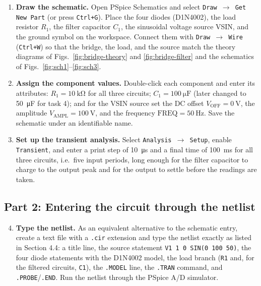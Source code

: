 \documentclass[12pt,a4paper]{article}
\begin{document}
	\begin{enumerate}[leftmargin=0.8cm,label=\textbf{Step \arabic*:},itemsep=0.55em]
		\item \textbf{Draw the schematic.}
		Open PSpice Schematics and select \texttt{Draw $\rightarrow$ Get New Part} (or press \texttt{Ctrl+G}). Place the four diodes (D1N4002), the load resistor $R_1$, the filter capacitor $C_1$, the sinusoidal voltage source VSIN, and the ground symbol on the workspace. Connect them with \texttt{Draw $\rightarrow$ Wire} (\texttt{Ctrl+W}) so that the bridge, the load, and the source match the theory diagrams of Figs.~\ref{fig:bridge-theory} and \ref{fig:bridge-filter} and the schematics of Figs.~\ref{fig:sch1}--\ref{fig:sch3}.
		
		\item \textbf{Assign the component values.}
		Double-click each component and enter its attributes: $R_1 = \SI{10}{\kilo\ohm}$ for all three circuits; $C_1 = \SI{100}{\micro\farad}$ (later changed to \SI{50}{\micro\farad} for task 4); and for the VSIN source set the DC offset $V_{\mathrm{OFF}} = \SI{0}{\volt}$, the amplitude $V_{\mathrm{AMPL}} = \SI{100}{\volt}$, and the frequency $\mathrm{FREQ} = \SI{50}{\hertz}$. Save the schematic under an identifiable name.
		
		\item \textbf{Set up the transient analysis.}
		Select \texttt{Analysis $\rightarrow$ Setup}, enable \texttt{Transient}, and enter a print step of \SI{10}{\micro\second} and a final time of \SI{100}{\milli\second} for all three circuits, i.e.\ five input periods, long enough for the filter capacitor to charge to the output peak and for the output to settle before the readings are taken.
	\end{enumerate}
	
	\subsection*{Part 2: Entering the circuit through the netlist}
	
	\begin{enumerate}[leftmargin=0.8cm,label=\textbf{Step \arabic*:},itemsep=0.55em]
		\setcounter{enumi}{3}
		\item \textbf{Type the netlist.}
		As an equivalent alternative to the schematic entry, create a text file with a \texttt{.cir} extension and type the netlist exactly as listed in Section 4.4: a title line, the source statement \texttt{V1 1 0 SIN(0 100 50)}, the four diode statements with the D1N4002 model, the load branch (\texttt{R1} and, for the filtered circuits, \texttt{C1}), the \texttt{.MODEL} line, the \texttt{.TRAN} command, and \texttt{.PROBE}/\texttt{.END}. Run the netlist through the PSpice A/D simulator.
	\end{enumerate}
	
\end{document}
